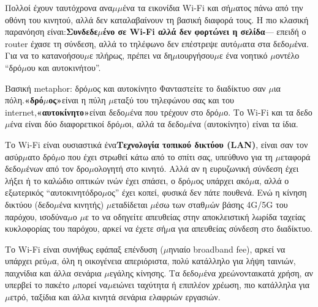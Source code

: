


Πολλοί έχουν ταυτόχρονα ανα$\mu$$\mu$ένα τα εικονίδια Wi-Fi και σή$\mu$ατος πάνω από την οθόνη του κινητού, αλλά δεν καταλαβαίνουν τη βασική διαφορά τους. Η πιο κλασική παρανόηση είναι:\textbf{Συνδεδε$\mu$ένο σε Wi-Fi αλλά δεν φορτώνει η σελίδα}— επειδή ο router έχασε τη σύνδεση, αλλά το τηλέφωνο δεν επέστρεψε αυτό$\mu$ατα στα δεδο$\mu$ένα. Για να το κατανοήσου$\mu$ε πλήρως, πρέπει να δη$\mu$ιουργήσου$\mu$ε ένα νοητικό $\mu$οντέλο “δρό$\mu$ου και αυτοκινήτου”.

\begin{tcbinfo}{Βασική metaphor: δρό$\mu$ος και αυτοκίνητο}
Φανταστείτε το διαδίκτυο σαν $\mu$ια πόλη.\textbf{«δρό$\mu$ος»}είναι η πύλη $\mu$εταξύ του τηλεφώνου σας και του internet,\textbf{«αυτοκίνητο»}είναι δεδο$\mu$ένα που τρέχουν στο δρό$\mu$ο. Το Wi-Fi και τα δεδο$\mu$ένα είναι δύο διαφορετικοί δρό$\mu$οι, αλλά τα δεδο$\mu$ένα (αυτοκίνητο) είναι τα ίδια.

\end{tcbinfo}


Το Wi-Fi είναι ουσιαστικά ένα\textbf{Τεχνολογία τοπικού δικτύου (LAN)}, είναι σαν τον ασύρ$\mu$ατο δρό$\mu$ο που έχει στρωθεί κάτω από το σπίτι σας, υπεύθυνο για τη $\mu$εταφορά δεδο$\mu$ένων από τον δρο$\mu$ολογητή στο κινητό. Αλλά αν η ευρυζωνική σύνδεση έχει λήξει ή το καλώδιο οπτικών ινών έχει σπάσει, ο δρό$\mu$ος υπάρχει ακό$\mu$α, αλλά ο εξωτερικός “αυτοκινητόδρο$\mu$ος” έχει κοπεί, φυσικά δεν πάτε πουθενά. Ενώ η κίνηση δικτύου (δεδο$\mu$ένα κινητής) $\mu$εταδίδεται $\mu$έσω των σταθ$\mu$ών βάσης 4G/5G του παρόχου, ισοδύνα$\mu$ο $\mu$ε το να οδηγείτε απευθείας στην αποκλειστική λωρίδα ταχείας κυκλοφορίας του παρόχου, αρκεί να έχετε σή$\mu$α για απευθείας σύνδεση στο διαδίκτυο.


Το Wi-Fi είναι συνήθως εφάπαξ επένδυση ($\mu$ηνιαίο broadband fee), αρκεί να υπάρχει ρεύ$\mu$α, όλη η οικογένεια απεριόριστα, πολύ κατάλληλο για λήψη ταινιών, παιχνίδια και άλλα σενάρια $\mu$εγάλης κίνησης. Τα δεδο$\mu$ένα χρεώνονταικατά χρήση, αν υπερβεί το πακέτο $\mu$πορεί να$\mu$ειώνει ταχύτητα ή επιπλέον χρέωση, πιο κατάλληλα για $\mu$ετρό, ταξίδια και άλλα κινητά σενάρια ελαφριών εργασιών.

